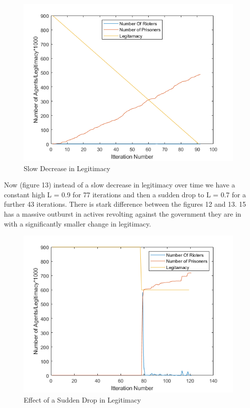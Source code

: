 \documentclass[11pt]{article}
\begin{document}
	\begin{figure}[H]
		\includegraphics[width=\linewidth]{effect of Legitamacy reduction.png}
		\caption{Slow Decrease in Legitimacy}
		\label{fig:yu}
	\end{figure}
	Now (figure 13) instead of a slow decrease in legitimacy over time we have a constant high L = 0.9 for 77 iterations and then a sudden drop to L =  0.7  for a further  43 iterations. There is stark difference between the figures 12 and 13. 15 has a massive outburst in actives revolting against the government they are in with a significantly smaller change in legitimacy.\\
	
	\begin{figure}[H]
		\includegraphics[width=\linewidth]{sudden effect of Legitamacy reduction.png}
		\caption{Effect of a Sudden Drop in Legitimacy}
		\label{fig:frenchriot}
	\end{figure}
	
\end{document}
